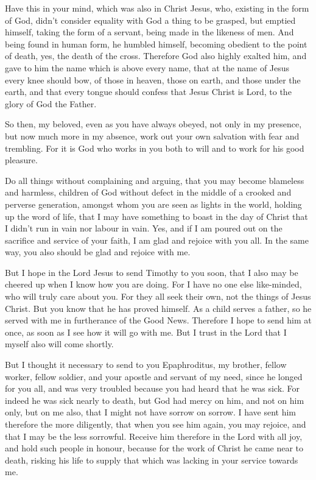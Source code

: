  Have this in your mind, which was also in Christ Jesus,
 who, existing in the form of God, didn't consider
equality with God a thing to be grasped,  but emptied
himself, taking the form of a servant, being made in the likeness of
men.  And being found in human form, he humbled himself,
becoming obedient to the point of death, yes, the death of the cross.
 Therefore God also highly exalted him, and gave to him
the name which is above every name,  that at the name of
Jesus every knee should bow, of those in heaven, those on earth, and
those under the earth,  and that every tongue should
confess that Jesus Christ is Lord, to the glory of God the Father.

 So then, my beloved, even as you have always obeyed, not
only in my presence, but now much more in my absence, work out your own
salvation with fear and trembling.  For it is God who
works in you both to will and to work for his good pleasure.

 Do all things without complaining and arguing,
 that you may become blameless and harmless, children of
God without defect in the middle of a crooked and perverse generation,
amongst whom you are seen as lights in the world, 
holding up the word of life, that I may have something to boast in the
day of Christ that I didn't run in vain nor labour in vain.
 Yes, and if I am poured out on the sacrifice and service
of your faith, I am glad and rejoice with you all.  In
the same way, you also should be glad and rejoice with me.

 But I hope in the Lord Jesus to send Timothy to you
soon, that I also may be cheered up when I know how you are doing.
 For I have no one else like-minded, who will truly care
about you.  For they all seek their own, not the things
of Jesus Christ.  But you know that he has proved
himself. As a child serves a father, so he served with me in furtherance
of the Good News.  Therefore I hope to send him at once,
as soon as I see how it will go with me.  But I trust in
the Lord that I myself also will come shortly.

 But I thought it necessary to send to you Epaphroditus,
my brother, fellow worker, fellow soldier, and your apostle and servant
of my need,  since he longed for you all, and was very
troubled because you had heard that he was sick.  For
indeed he was sick nearly to death, but God had mercy on him, and not on
him only, but on me also, that I might not have sorrow on sorrow.
 I have sent him therefore the more diligently, that when
you see him again, you may rejoice, and that I may be the less
sorrowful.  Receive him therefore in the Lord with all
joy, and hold such people in honour,  because for the
work of Christ he came near to death, risking his life to supply that
which was lacking in your service towards me.

